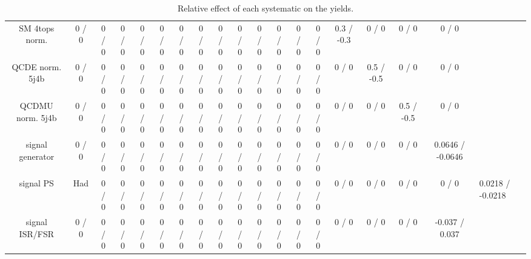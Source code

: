 \documentclass[10pt]{article}
\begin{document}
\begin{table}[htbp]
\begin{center}
\begin{tabular}{|c|c|c|c|c|c|c|c|c|c|c|c|c|c|c|c|c|c|}
  SM 4tops norm. & 0 / 0 & 0 / 0 & 0 / 0 & 0 / 0 & 0 / 0 & 0 / 0 & 0 / 0 & 0 / 0 & 0 / 0 & 0 / 0 & 0 / 0 & 0 / 0 & 0 / 0 & 0.3 / -0.3 & 0 / 0 & 0 / 0 & 0 / 0 \\ 
  QCDE norm. 5j4b & 0 / 0 & 0 / 0 & 0 / 0 & 0 / 0 & 0 / 0 & 0 / 0 & 0 / 0 & 0 / 0 & 0 / 0 & 0 / 0 & 0 / 0 & 0 / 0 & 0 / 0 & 0 / 0 & 0.5 / -0.5 & 0 / 0 & 0 / 0 \\ 
  QCDMU norm. 5j4b & 0 / 0 & 0 / 0 & 0 / 0 & 0 / 0 & 0 / 0 & 0 / 0 & 0 / 0 & 0 / 0 & 0 / 0 & 0 / 0 & 0 / 0 & 0 / 0 & 0 / 0 & 0 / 0 & 0 / 0 & 0.5 / -0.5 & 0 / 0 \\ 
  signal generator & 0 / 0 & 0 / 0 & 0 / 0 & 0 / 0 & 0 / 0 & 0 / 0 & 0 / 0 & 0 / 0 & 0 / 0 & 0 / 0 & 0 / 0 & 0 / 0 & 0 / 0 & 0 / 0 & 0 / 0 & 0 / 0 & 0.0646 / -0.0646 \\ 
  signal PS & Had & 0 / 0 & 0 / 0 & 0 / 0 & 0 / 0 & 0 / 0 & 0 / 0 & 0 / 0 & 0 / 0 & 0 / 0 & 0 / 0 & 0 / 0 & 0 / 0 & 0 / 0 & 0 / 0 & 0 / 0 & 0 / 0 & 0.0218 / -0.0218 \\ 
  signal ISR/FSR & 0 / 0 & 0 / 0 & 0 / 0 & 0 / 0 & 0 / 0 & 0 / 0 & 0 / 0 & 0 / 0 & 0 / 0 & 0 / 0 & 0 / 0 & 0 / 0 & 0 / 0 & 0 / 0 & 0 / 0 & 0 / 0 & -0.037 / 0.037 \\ 
\hline 
\end{tabular} 
\caption{Relative effect of each systematic on the yields.} 
\end{center} 
\end{table} 
\end{document}

